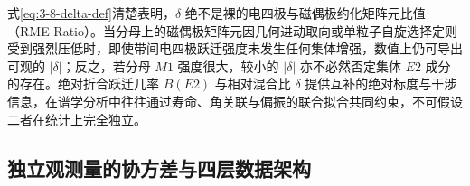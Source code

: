 \begin{itemize}
\begin{equation}
\end{equation}
式\eqref{eq:3-8-delta-def}清楚表明，$\delta$ 绝不是裸的电四极与磁偶极约化矩阵元比值（RME Ratio）。当分母上的磁偶极矩阵元因几何进动取向或单粒子自旋选择定则受到强烈压低时，即使带间电四极跃迁强度未发生任何集体增强，数值上仍可导出可观的 $|\delta|$；反之，若分母 $M1$ 强度很大，较小的 $|\delta|$ 亦不必然否定集体 $E2$ 成分的存在。绝对折合跃迁几率 $B(E2)$ 与相对混合比 $\delta$ 提供互补的绝对标度与干涉信息，在谱学分析中往往通过寿命、角关联与偏振的联合拟合共同约束，不可假设二者在统计上完全独立。
\end{itemize}

\subsection{独立观测量的协方差与四层数据架构}\label{sec:3-8-3}

